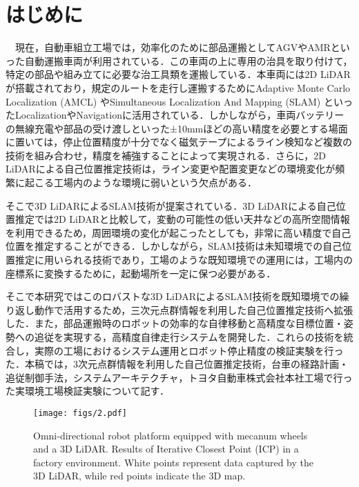 \section{はじめに}
　現在，自動車組立工場では，効率化のために部品運搬としてAGVやAMRといった自動運搬車両が利用されている．この車両の上に専用の治具を取り付けて，特定の部品や組み立てに必要な治工具類を運搬している．本車両には2D LiDARが搭載されており，規定のルートを走行し運搬するためにAdaptive Monte Carlo Localization (AMCL) やSimultaneous Localization And Mapping (SLAM)\cite{2d-AMCL, 2d-SLAM} といったLocalizationやNavigationに活用されている．しかしながら，車両バッテリーの無線充電や部品の受け渡しといった±10mmほどの高い精度を必要とする場面に置いては，停止位置精度が十分でなく磁気テープによるライン検知など複数の技術を組み合わせ，精度を補強することによって実現される．さらに，2D LiDARによる自己位置推定技術は，ライン変更や配置変更などの環境変化が頻繁に起こる工場内のような環境に弱いという欠点がある．

そこで3D LiDARによるSLAM技術が提案されている\cite{6DSLAM_outside, 3D_SLAM_outside, EKF_SLAM, FAST-LIO, FAST-LIO2}．3D LiDARによる自己位置推定では2D LiDARと比較して，変動の可能性の低い天井などの高所空間情報を利用できるため，周囲環境の変化が起こったとしても，非常に高い精度で自己位置を推定することができる．しかしながら，SLAM技術は未知環境での自己位置推定に用いられる技術であり，工場のような既知環境での運用には，工場内の座標系に変換するために，起動場所を一定に保つ必要がある．

そこで本研究ではこのロバストな3D LiDARによるSLAM技術を既知環境での繰り返し動作で活用するため，三次元点群情報を利用した自己位置推定技術へ拡張した．また，部品運搬時のロボットの効率的な自律移動と高精度な目標位置・姿勢への追従を実現する，高精度自律走行システムを開発した．これらの技術を統合し，実際の工場におけるシステム運用とロボット停止精度の検証実験を行った．本稿では，3次元点群情報を利用した自己位置推定技術，台車の経路計画・追従制御手法，システムアーキテクチャ，トヨタ自動車株式会社本社工場で行った実環境工場検証実験について記す．

\begin{figure}[!t]
  \texttt{[image: figs/2.pdf]}
  \caption{Omni-directional robot platform equipped with mecanum wheels and a 3D LiDAR. Results of Iterative Closest Point (ICP) in a factory environment. White points represent data captured by the 3D LiDAR, while red points indicate the 3D map.}
\label{fig:fig2}

\end{figure}
